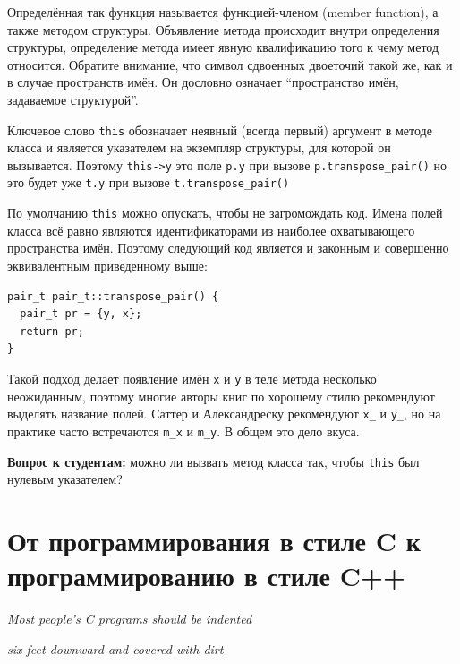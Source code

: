 \documentclass[a4paper,12pt,oneside]{book}
\newif\ifanswers
\begin{document}
Определённая так функция называется функцией-членом (member function), а также методом структуры. Объявление метода происходит внутри определения структуры, определение метода имеет явную квалификацию того к чему метод относится. Обратите внимание, что символ сдвоенных двоеточий такой же, как и в случае пространств имён. Он дословно означает ``пространство имён, задаваемое структурой''.

Ключевое слово \lstinline!this! обозначает неявный (всегда первый) аргумент в методе класса и является указателем на экземпляр структуры, для которой он вызывается. Поэтому \lstinline!this->y! это поле \lstinline!p.y! при вызове \lstinline!p.transpose_pair()! но это будет уже \lstinline!t.y! при вызове \lstinline!t.transpose_pair()!

По умолчанию \lstinline!this! можно опускать, чтобы не загромождать код. Имена полей класса всё равно являются идентификаторами из наиболее охватывающего пространства имён. Поэтому следующий код является и законным и совершенно эквивалентным приведенному выше:

\begin{lstlisting}
pair_t pair_t::transpose_pair() {
  pair_t pr = {y, x};
  return pr;
} 
\end{lstlisting}

Такой подход делает появление имён \lstinline!x! и \lstinline!y! в теле метода несколько неожиданным, поэтому многие авторы книг по хорошему стилю рекомендуют выделять название полей. Саттер и Александреску \cite{sutteralexandresku} рекомендуют \lstinline!x_! и \lstinline!y_!, но на практике часто встречаются \lstinline!m_x! и \lstinline!m_y!. В общем это дело вкуса.

\textbf{Вопрос к студентам:} можно ли вызвать метод класса так, чтобы \lstinline!this! был нулевым указателем?

\ifanswers
Правильный ответ: да, через явное приведение типов. Но лучше так не делать, это UB.
\fi

\pagebreak
\section{От программирования в стиле C к программированию в стиле C++}

\hfill\textit{Most people's C programs should be indented}

\hfill\textit{six feet downward and covered with dirt}{\vspace{0.5em}}
\end{document}

